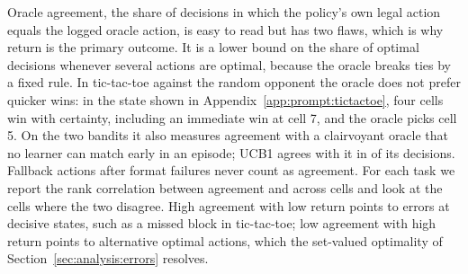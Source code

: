 Oracle agreement, the share of decisions in which the policy's own legal action equals the logged oracle action, is easy to read but has two flaws, which is why return is the primary outcome. It is a lower bound on the share of optimal decisions whenever several actions are optimal, because the oracle breaks ties by a fixed rule. In tic-tac-toe against the random opponent the oracle does not prefer quicker wins: in the state shown in Appendix~\ref{app:prompt:tictactoe}, four cells win with certainty, including an immediate win at cell 7, and the oracle picks cell 5. On the two bandits it also measures agreement with a clairvoyant oracle that no learner can match early in an episode; UCB1 agrees with it in \result{[share]} of its decisions. Fallback actions after format failures never count as agreement. For each task we report the rank correlation between agreement and \norm{} across cells  and look at the cells where the two disagree. High agreement with low return points to errors at decisive states, such as a missed block in tic-tac-toe; low agreement with high return points to alternative optimal actions, which the set-valued optimality of Section~\ref{sec:analysis:errors} resolves.
